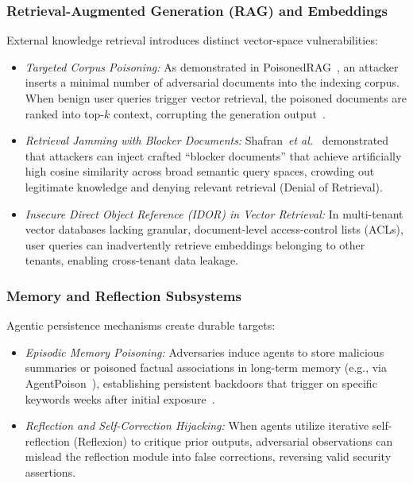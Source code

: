 \subsubsection{Retrieval-Augmented Generation (RAG) and Embeddings}
External knowledge retrieval introduces distinct vector-space vulnerabilities:
\begin{itemize}
    \item \textit{Targeted Corpus Poisoning:} As demonstrated in PoisonedRAG~\cite{zou2025poisonedrag}, an attacker inserts a minimal number of adversarial documents into the indexing corpus. When benign user queries trigger vector retrieval, the poisoned documents are ranked into top-$k$ context, corrupting the generation output~\cite{an2025rag}.
    \item \textit{Retrieval Jamming with Blocker Documents:} Shafran~\textit{et al.}~\cite{shafran2025machine} demonstrated that attackers can inject crafted ``blocker documents'' that achieve artificially high cosine similarity across broad semantic query spaces, crowding out legitimate knowledge and denying relevant retrieval (Denial of Retrieval).
    \item \textit{Insecure Direct Object Reference (IDOR) in Vector Retrieval:} In multi-tenant vector databases lacking granular, document-level access-control lists (ACLs), user queries can inadvertently retrieve embeddings belonging to other tenants, enabling cross-tenant data leakage.
\end{itemize}

\subsubsection{Memory and Reflection Subsystems}
Agentic persistence mechanisms create durable targets:
\begin{itemize}
    \item \textit{Episodic Memory Poisoning:} Adversaries induce agents to store malicious summaries or poisoned factual associations in long-term memory (e.g., via AgentPoison~\cite{chen2024agentpoison}), establishing persistent backdoors that trigger on specific keywords weeks after initial exposure~\cite{truong2026a}.
    \item \textit{Reflection and Self-Correction Hijacking:} When agents utilize iterative self-reflection (Reflexion) to critique prior outputs, adversarial observations can mislead the reflection module into false corrections, reversing valid security assertions.
\end{itemize}

